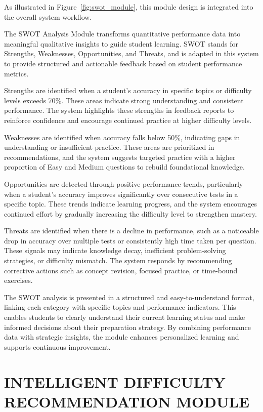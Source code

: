 \begin{sloppypar}
As illustrated in Figure~\ref{fig:swot_module}, this module design is integrated into the overall system workflow.

The SWOT Analysis Module transforms quantitative performance data into meaningful qualitative insights to guide student learning. SWOT stands for Strengths, Weaknesses, Opportunities, and Threats, and is adapted in this system to provide structured and actionable feedback based on student performance metrics.

Strengths are identified when a student's accuracy in specific topics or difficulty levels exceeds 70\%. These areas indicate strong understanding and consistent performance. The system highlights these strengths in feedback reports to reinforce confidence and encourage continued practice at higher difficulty levels.

Weaknesses are identified when accuracy falls below 50\%, indicating gaps in understanding or insufficient practice. These areas are prioritized in recommendations, and the system suggests targeted practice with a higher proportion of Easy and Medium questions to rebuild foundational knowledge.

Opportunities are detected through positive performance trends, particularly when a student's accuracy improves significantly over consecutive tests in a specific topic. These trends indicate learning progress, and the system encourages continued effort by gradually increasing the difficulty level to strengthen mastery.

Threats are identified when there is a decline in performance, such as a noticeable drop in accuracy over multiple tests or consistently high time taken per question. These signals may indicate knowledge decay, inefficient problem-solving strategies, or difficulty mismatch. The system responds by recommending corrective actions such as concept revision, focused practice, or time-bound exercises.

The SWOT analysis is presented in a structured and easy-to-understand format, linking each category with specific topics and performance indicators. This enables students to clearly understand their current learning status and make informed decisions about their preparation strategy. By combining performance data with strategic insights, the module enhances personalized learning and supports continuous improvement.

\section{\MakeUppercase{INTELLIGENT DIFFICULTY RECOMMENDATION MODULE}}


\end{sloppypar}
